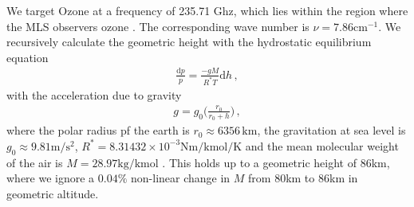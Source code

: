 We target Ozone at a frequency of 235.71 Ghz, which lies within the region where the MLS observers ozone \cite{livesey2008ozonecarbonmono, waters2006earth}.
The corresponding wave number is $\nu = 7.86\text{cm}^{-1}$.
We recursively calculate the geometric height with the hydrostatic equilibrium equation
\begin{align}
	\frac{\text{d}p}{p} = \frac{- g M}{R^* T} \text{d} h \, ,\label{eq:hydr}
\end{align}
with the acceleration due to gravity
\begin{align}
	g = g_0 \Bigg( \frac{r_0}{r_0 + h} \Bigg) \, ,
\end{align}
where the polar radius pf the earth is $r_0 \approx 6356 \, \text{km}$, the gravitation at sea level is $g_0 \approx 9.81 \text{m}/\text{s}^2$, $R^* = 8.31432 \times 10^{-3} \text{Nm} / \text{kmol} / \text{K}$ and the mean molecular weight of the air is $M = 28.97 \text{kg/kmol}$ \cite{atmosphere1976us}.
This holds up to a geometric height of $86$km, where we ignore a $0.04\%$ non-linear change in $M$ from $80$km to $86$km in geometric altitude.

